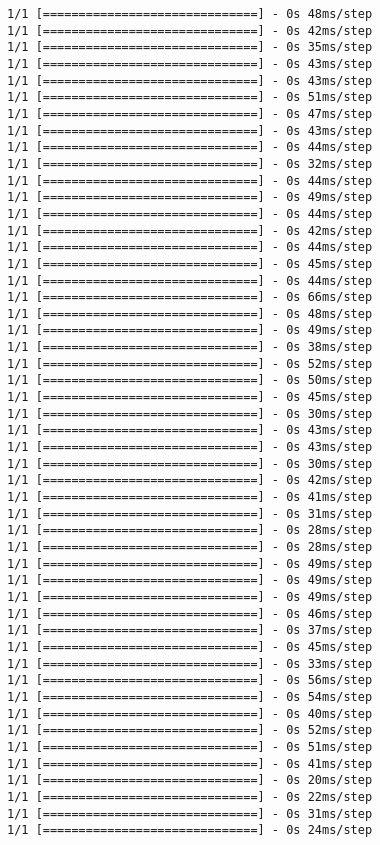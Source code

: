 \documentclass[11pt]{article}
\begin{document}
\begin{Verbatim}[commandchars=\\\{\}]
1/1 [==============================] - 0s 48ms/step
1/1 [==============================] - 0s 42ms/step
1/1 [==============================] - 0s 35ms/step
1/1 [==============================] - 0s 43ms/step
1/1 [==============================] - 0s 43ms/step
1/1 [==============================] - 0s 51ms/step
1/1 [==============================] - 0s 47ms/step
1/1 [==============================] - 0s 43ms/step
1/1 [==============================] - 0s 44ms/step
1/1 [==============================] - 0s 32ms/step
1/1 [==============================] - 0s 44ms/step
1/1 [==============================] - 0s 49ms/step
1/1 [==============================] - 0s 44ms/step
1/1 [==============================] - 0s 42ms/step
1/1 [==============================] - 0s 44ms/step
1/1 [==============================] - 0s 45ms/step
1/1 [==============================] - 0s 44ms/step
1/1 [==============================] - 0s 66ms/step
1/1 [==============================] - 0s 48ms/step
1/1 [==============================] - 0s 49ms/step
1/1 [==============================] - 0s 38ms/step
1/1 [==============================] - 0s 52ms/step
1/1 [==============================] - 0s 50ms/step
1/1 [==============================] - 0s 45ms/step
1/1 [==============================] - 0s 30ms/step
1/1 [==============================] - 0s 43ms/step
1/1 [==============================] - 0s 43ms/step
1/1 [==============================] - 0s 30ms/step
1/1 [==============================] - 0s 42ms/step
1/1 [==============================] - 0s 41ms/step
1/1 [==============================] - 0s 31ms/step
1/1 [==============================] - 0s 28ms/step
1/1 [==============================] - 0s 28ms/step
1/1 [==============================] - 0s 49ms/step
1/1 [==============================] - 0s 49ms/step
1/1 [==============================] - 0s 49ms/step
1/1 [==============================] - 0s 46ms/step
1/1 [==============================] - 0s 37ms/step
1/1 [==============================] - 0s 45ms/step
1/1 [==============================] - 0s 33ms/step
1/1 [==============================] - 0s 56ms/step
1/1 [==============================] - 0s 54ms/step
1/1 [==============================] - 0s 40ms/step
1/1 [==============================] - 0s 52ms/step
1/1 [==============================] - 0s 51ms/step
1/1 [==============================] - 0s 41ms/step
1/1 [==============================] - 0s 20ms/step
1/1 [==============================] - 0s 22ms/step
1/1 [==============================] - 0s 31ms/step
1/1 [==============================] - 0s 24ms/step

\end{Verbatim}
\end{document}
